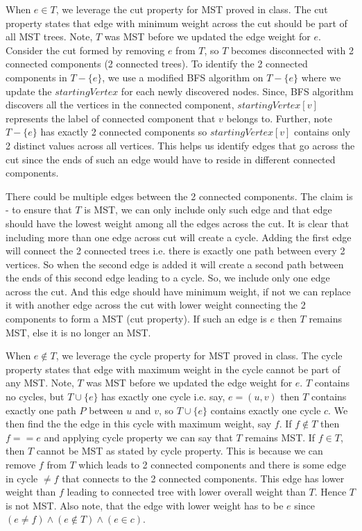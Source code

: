 \documentclass{article}
\begin{document}
    When $e \in T$, we leverage the cut property for MST proved in class. The cut property states that edge with minimum weight across the cut should be part of all MST trees. Note, $T$ was MST before we updated the edge weight for $e$. Consider the cut formed by removing $e$ from $T$, so $T$ becomes disconnected with 2 connected components (2 connected trees). To identify the 2 connected components in $T-\{e\}$, we use a modified BFS algorithm on $T-\{e\}$ where we update the $startingVertex$ for each newly discovered nodes. Since, BFS algorithm discovers all the vertices in the connected component, $startingVertex[v]$ represents the label of connected component that $v$ belongs to. Further, note $T-\{e\}$ has exactly 2 connected components so $startingVertex[v]$ contains only 2 distinct values across all vertices. This helps us identify edges that go across the cut since the ends of such an edge would have to reside in different connected components.

    There could be multiple edges between the 2 connected components. The claim is - to ensure that $T$ is MST, we can only include only such edge and that edge should have the lowest weight among all the edges across the cut. It is clear that including more than one edge across cut will create a cycle. Adding the first edge will connect the 2 connected trees i.e. there is exactly one path between every 2 vertices. So when the second edge is added it will create a second path between the ends of this second edge leading to a cycle. So, we include only one edge across the cut. And this edge should have minimum weight, if not we can replace it with another edge across the cut with lower weight connecting the 2 components to form a MST (cut property). If such an edge is $e$ then $T$ remains MST, else it is no longer an MST.

    When $e \notin T$, we leverage the cycle property for MST proved in class. The cycle property states that edge with maximum weight in the cycle cannot be part of any MST. Note, $T$ was MST before we updated the edge weight for $e$. $T$ contains no cycles, but $T \cup \{e\}$ has exactly one cycle i.e. say, $e = (u,v)$ then $T$ contains exactly one path $P$ between $u$ and $v$, so $T \cup \{e\}$ contains exactly one cycle $c$. We then find the the edge in this cycle with maximum weight, say $f$. If $f \notin T$ then $f == e$ and applying cycle property we can say that $T$ remains MST. If $f \in T$, then $T$ cannot be MST as stated by cycle property. This is because we can remove $f$ from $T$ which leads to 2 connected components and there is some edge in cycle $\neq f$ that connects to the 2 connected components. This edge has lower weight than $f$ leading to connected tree with lower overall weight than $T$. Hence $T$ is not MST. Also note, that the edge with lower weight has to be $e$ since $(e \neq f) \land (e \notin T) \land (e \in c)$.
\end{document}
